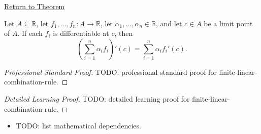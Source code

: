 \newpage
{}
\label{prf:finite-linear-combination-rule}

\begin{remark*}[Return]
\hyperref[thm:finite-linear-combination-rule]{Return to Theorem}
\end{remark*}

\begin{theorem*}
Let $A \subseteq \mathbb{R}$, let $f_1, \dots, f_n : A \to \mathbb{R}$, let $\alpha_1, \dots, \alpha_n \in \mathbb{R}$, and let $c \in A$ be a limit point of $A$. If each $f_i$ is differentiable at $c$, then
\[
\left(\sum_{i=1}^{n} \alpha_i f_i\right)'(c) = \sum_{i=1}^{n} \alpha_i f_i'(c).
\]
\end{theorem*}

\begin{proof}[Professional Standard Proof]
\LRAProofBodyStart
TODO: professional standard proof for finite-linear-combination-rule.
\end{proof}

\begin{proof}[Detailed Learning Proof]
\LRAProofBodyStart
TODO: detailed learning proof for finite-linear-combination-rule.
\end{proof}

\begin{remark*}
\end{remark*}

\begin{dependencies}
\begin{itemize}
  \item TODO: list mathematical dependencies.
\end{itemize}
\end{dependencies}

\clearpage
